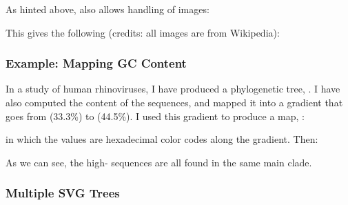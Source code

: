 As hinted above, \libxml{} also allows handling of images:


This gives the following (credits: all images are from Wikipedia):

\startalignment[center]
\stopalignment

\subsubsection[sct_display_ornament_xpl_gc]{Example: Mapping GC Content}

 In a study of human rhinoviruses, I have produced a phylogenetic tree,
 . I have also computed the \gc{} content of the sequences,
 and mapped it into a gradient that goes from \color[blue]{blue} (33.3\%) to
\color[red]{red} (44.5\%). I used this gradient to produce a \css{} map,
:


\noindent{}in which the  values are hexadecimal color codes along
the gradient. Then:

\startalignment[center]
\stopalignment
\bigskip{}

\noindent{}As we can see, the high-\gc{} sequences are all found in the same
main clade.

\subsubsection{Multiple SVG Trees}

